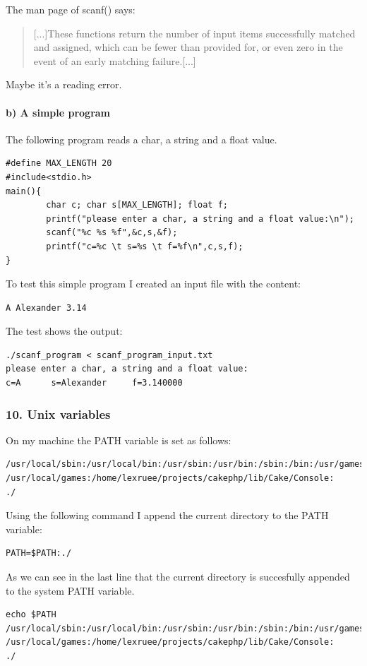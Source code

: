 \documentclass[12pt]{article}
\begin{document}
The man page of scanf() says:
\begin{quote}
[...]These functions return the number of input items  successfully  matched and assigned, which can be fewer than provided for, or even zero in the event of an early matching failure.[...]
\end{quote}
Maybe it's a reading error.

\paragraph*{b) A simple program}
The following program reads a char, a string and a float value.
\begin{lstlisting}
#define MAX_LENGTH 20
#include<stdio.h>
main(){
        char c; char s[MAX_LENGTH]; float f;
        printf("please enter a char, a string and a float value:\n");
        scanf("%c %s %f",&c,s,&f);
        printf("c=%c \t s=%s \t f=%f\n",c,s,f);
}
\end{lstlisting}
To test this simple program I created an input file with the content:
\begin{lstlisting}
A Alexander 3.14
\end{lstlisting}
The test shows the output:
\begin{lstlisting}
./scanf_program < scanf_program_input.txt 
please enter a char, a string and a float value:
c=A 	 s=Alexander 	 f=3.140000
\end{lstlisting}
\subsubsection*{10. Unix variables}
On my machine the PATH variable is set as follows:
\begin{lstlisting}
/usr/local/sbin:/usr/local/bin:/usr/sbin:/usr/bin:/sbin:/bin:/usr/games:
/usr/local/games:/home/lexruee/projects/cakephp/lib/Cake/Console:
./
\end{lstlisting}
Using the following command I append the current directory to the PATH  variable:
\begin{lstlisting}
PATH=$PATH:./
\end{lstlisting}
As we can see in the last line that the current directory is succesfully appended to the system PATH variable.
\begin{lstlisting}
echo $PATH
/usr/local/sbin:/usr/local/bin:/usr/sbin:/usr/bin:/sbin:/bin:/usr/games:
/usr/local/games:/home/lexruee/projects/cakephp/lib/Cake/Console:
./
\end{lstlisting}
\end{document}
